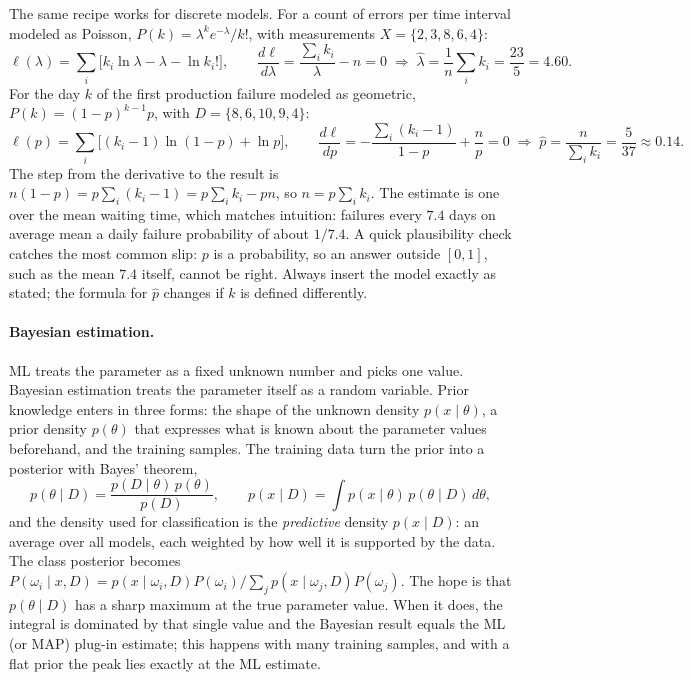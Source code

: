 The same recipe works for discrete models. For a count of errors per time
interval modeled as Poisson, $P(k) = \lambda^k e^{-\lambda}/k!$, with
measurements $X = \{2,3,8,6,4\}$:
\begin{equation}
  \ell(\lambda) = \sum_{i}\bigl[k_i\ln\lambda - \lambda - \ln k_i!\bigr],
  \qquad
  \frac{d\ell}{d\lambda} = \frac{\sum_i k_i}{\lambda} - n = 0
  \;\Rightarrow\;
  \hat\lambda = \frac1n\sum_i k_i = \frac{23}{5} = 4.60 .
\end{equation}
\noindent
For the day $k$ of the first production failure modeled as geometric,
$P(k) = (1-p)^{k-1}p$, with $D = \{8,6,10,9,4\}$:
\begin{equation}
  \ell(p) = \sum_i\bigl[(k_i-1)\ln(1-p) + \ln p\bigr],
  \qquad
  \frac{d\ell}{dp} = -\frac{\sum_i(k_i-1)}{1-p} + \frac{n}{p} = 0
  \;\Rightarrow\;
  \hat p = \frac{n}{\sum_i k_i} = \frac{5}{37}\approx 0.14 .
\end{equation}
\noindent
The step from the derivative to the result is
$n(1-p) = p\sum_i(k_i-1) = p\sum_i k_i - pn$, so $n = p\sum_i k_i$. The estimate
is one over the mean waiting time, which matches intuition: failures every
$7.4$ days on average mean a daily failure probability of about $1/7.4$. A
quick plausibility check catches the most common slip: $p$ is a probability, so
an answer outside $[0,1]$, such as the mean $7.4$ itself, cannot be right.
Always insert the model exactly as stated; the formula for $\hat p$ changes if
$k$ is defined differently.

\paragraph{Bayesian estimation.}
ML treats the parameter as a fixed unknown number and picks one value. Bayesian
estimation treats the parameter itself as a random variable. Prior knowledge
enters in three forms: the shape of the unknown density $p(x\mid\theta)$, a
prior density $p(\theta)$ that expresses what is known about the parameter
values beforehand, and the training samples. The training data turn the prior
into a posterior with Bayes' theorem,
\begin{equation}
  p(\theta\mid D) = \frac{p(D\mid\theta)\,p(\theta)}{p(D)},
  \qquad
  p(x\mid D) = \int p(x\mid\theta)\,p(\theta\mid D)\,d\theta ,
  \label{eq:bayes-est}
\end{equation}
\noindent
and the density used for classification is the \emph{predictive} density
$p(x\mid D)$: an average over all models, each weighted by how well it is
supported by the data. The class posterior becomes
$P(\omega_i\mid x,D) = p(x\mid\omega_i,D)P(\omega_i)/\sum_j p(x\mid\omega_j,D)P(\omega_j)$.
The hope is that $p(\theta\mid D)$ has a sharp maximum at the true parameter
value. When it does, the integral is dominated by that single value and the
Bayesian result equals the ML (or MAP) plug-in estimate; this happens with many
training samples, and with a flat prior the peak lies exactly at the ML
estimate.

